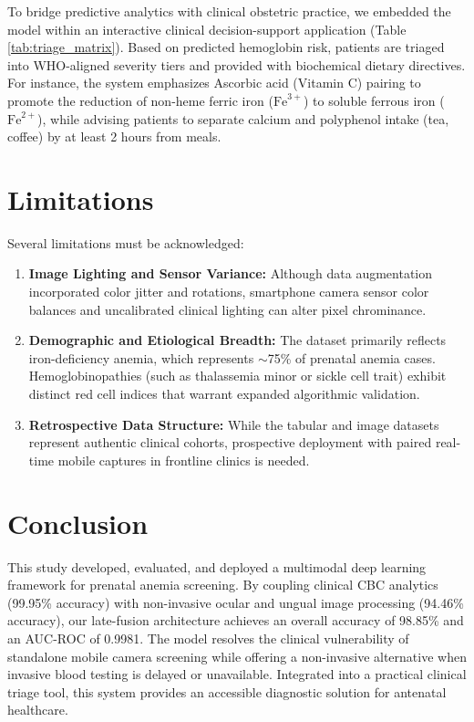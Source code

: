 \documentclass[journal,10pt,twocolumn]{IEEEtran}
\begin{document}
To bridge predictive analytics with clinical obstetric practice, we embedded the model within an interactive clinical decision-support application (Table \ref{tab:triage_matrix}). Based on predicted hemoglobin risk, patients are triaged into WHO-aligned severity tiers and provided with biochemical dietary directives. For instance, the system emphasizes Ascorbic acid (Vitamin C) pairing to promote the reduction of non-heme ferric iron ($\text{Fe}^{3+}$) to soluble ferrous iron ($\text{Fe}^{2+}$), while advising patients to separate calcium and polyphenol intake (tea, coffee) by at least 2 hours from meals.

\section{Limitations}
Several limitations must be acknowledged:
\begin{enumerate}
    \item \textbf{Image Lighting and Sensor Variance:} Although data augmentation incorporated color jitter and rotations, smartphone camera sensor color balances and uncalibrated clinical lighting can alter pixel chrominance.
    \item \textbf{Demographic and Etiological Breadth:} The dataset primarily reflects iron-deficiency anemia, which represents $\sim$75\% of prenatal anemia cases. Hemoglobinopathies (such as thalassemia minor or sickle cell trait) exhibit distinct red cell indices that warrant expanded algorithmic validation.
    \item \textbf{Retrospective Data Structure:} While the tabular and image datasets represent authentic clinical cohorts, prospective deployment with paired real-time mobile captures in frontline clinics is needed.
\end{enumerate}

\section{Conclusion}
This study developed, evaluated, and deployed a multimodal deep learning framework for prenatal anemia screening. By coupling clinical CBC analytics (99.95\% accuracy) with non-invasive ocular and ungual image processing (94.46\% accuracy), our late-fusion architecture achieves an overall accuracy of 98.85\% and an AUC-ROC of 0.9981. The model resolves the clinical vulnerability of standalone mobile camera screening while offering a non-invasive alternative when invasive blood testing is delayed or unavailable. Integrated into a practical clinical triage tool, this system provides an accessible diagnostic solution for antenatal healthcare.
\end{document}
